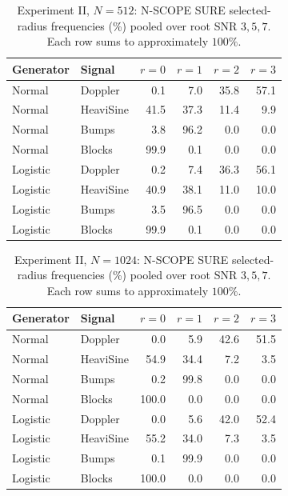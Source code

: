 \documentclass[11pt]{article}
\numberwithin{equation}{section}
\begin{document}
\begin{table}[H]
\centering\small
\caption{Experiment II, $N=512$: N-SCOPE SURE selected-radius frequencies (\%) pooled over root SNR $3,5,7$. Each row sums to approximately $100\%$.}
\label{tab:s5-radius-512}
\setlength{\tabcolsep}{5pt}
\begin{tabular}{llrrrr}
\toprule
Generator & Signal & $r=0$ & $r=1$ & $r=2$ & $r=3$ \\
\midrule
Normal & Doppler & 0.1 & 7.0 & 35.8 & 57.1 \\
Normal & HeaviSine & 41.5 & 37.3 & 11.4 & 9.9 \\
Normal & Bumps & 3.8 & 96.2 & 0.0 & 0.0 \\
Normal & Blocks & 99.9 & 0.1 & 0.0 & 0.0 \\
Logistic & Doppler & 0.2 & 7.4 & 36.3 & 56.1 \\
Logistic & HeaviSine & 40.9 & 38.1 & 11.0 & 10.0 \\
Logistic & Bumps & 3.5 & 96.5 & 0.0 & 0.0 \\
Logistic & Blocks & 99.9 & 0.1 & 0.0 & 0.0 \\
\bottomrule
\end{tabular}
\end{table}

\begin{table}[H]
\centering\small
\caption{Experiment II, $N=1024$: N-SCOPE SURE selected-radius frequencies (\%) pooled over root SNR $3,5,7$. Each row sums to approximately $100\%$.}
\label{tab:s5-radius-1024}
\setlength{\tabcolsep}{5pt}
\begin{tabular}{llrrrr}
\toprule
Generator & Signal & $r=0$ & $r=1$ & $r=2$ & $r=3$ \\
\midrule
Normal & Doppler & 0.0 & 5.9 & 42.6 & 51.5 \\
Normal & HeaviSine & 54.9 & 34.4 & 7.2 & 3.5 \\
Normal & Bumps & 0.2 & 99.8 & 0.0 & 0.0 \\
Normal & Blocks & 100.0 & 0.0 & 0.0 & 0.0 \\
Logistic & Doppler & 0.0 & 5.6 & 42.0 & 52.4 \\
Logistic & HeaviSine & 55.2 & 34.0 & 7.3 & 3.5 \\
Logistic & Bumps & 0.1 & 99.9 & 0.0 & 0.0 \\
Logistic & Blocks & 100.0 & 0.0 & 0.0 & 0.0 \\
\bottomrule
\end{tabular}
\end{table}
\end{document}
